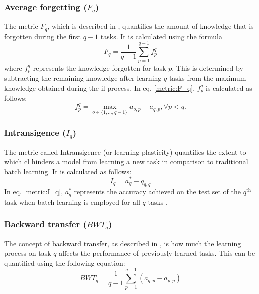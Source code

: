 \subsubsection{Average forgetting ($F_{q}$)}
The metric $F_{q}$, which is described in \citep{qu2021recent}, quantifies the amount of knowledge that is forgotten during the first $q-1$ tasks. It is calculated using the formula \begin{equation}
\label{metric:F_q}
    F_{q} = \frac{1}{q-1} \sum_{p=1}^{q-1} f_{p}^{q} 
\end{equation} 
where $f_{p}^{q}$ represents the knowledge forgotten for task $p$. This is determined by subtracting the remaining knowledge after learning $q$ tasks from the maximum knowledge obtained during the \acrshort{il} process. In eq. \ref{metric:F_q}, $f_{p}^{q}$ is calculated as follows: 
\begin{equation}
\label{metric:f_p_q}
  f_{p}^{q} = \max_{o \in \{ 1, ..., q-1\}} a_{o,p} - a_{q,p} , \forall p < q.
\end{equation}

\subsubsection{Intransigence ($I_{q}$)}
The metric called Intransigence (or learning plasticity) quantifies the extent to which \acrshort{cl} hinders a model from learning a new task in comparison to traditional batch learning. It is calculated as follows: 
\begin{equation}
\label{metric:I_q}
    I_{q} = a^{*}_{q} - q_{q,q}
\end{equation} 
In eq. \ref{metric:I_q}, $a^{*}_{q}$ represents the accuracy achieved on the test set of the $q^{\text{th}}$ task when batch learning is employed for all $q$ tasks \citep{chaudhry2018riemannian}.

\subsubsection{Backward transfer ($BWT_{q}$)}
The concept of backward transfer, as described in \citep{lopez2017gradient}, is how much the learning process on task $q$ affects the performance of previously learned tasks. This can be quantified using the following equation: \begin{equation}
\label{metric:BWT_q}
BWT_{q} = \frac{1}{q-1} \sum_{p=1}^{q-1} (a_{q,p} - a_{p,p})
\end{equation}

